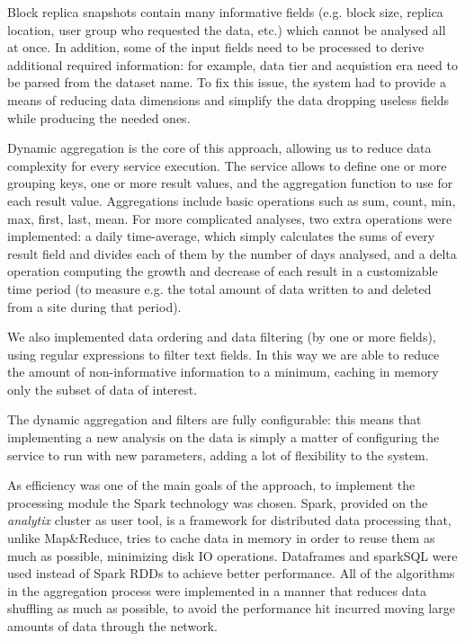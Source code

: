 \documentclass[a4paper]{jpconf}
\begin{document}
Block replica snapshots contain many informative fields (e.g. block size, replica location, user group who requested the data, etc.) which cannot be analysed all at once. In addition, some of the input fields need to be processed to derive additional required information: for example, data tier and acquistion era need to be parsed from the dataset name.
 To fix this issue, the system had to provide a means of reducing data dimensions and simplify the data dropping useless fields while producing the needed ones.
 
 
Dynamic aggregation is the core of this approach, allowing us to reduce data complexity for every service execution. The service allows to define one or more grouping keys, one or more result values, and the aggregation function to use for each result value. Aggregations include basic operations such as sum, count, min, max, first, last, mean.
For more complicated analyses, two extra operations were implemented: a daily time-average, 
which simply calculates the sums of every result field and divides each of them by the number of days analysed, and a delta operation computing the growth and decrease of each result in a customizable time period (to measure e.g. the total amount of data written to and deleted from a site during that period).

We also implemented data ordering and data filtering (by one or more fields), using regular expressions to filter text fields.
In this way we are able to reduce the amount of non-informative information to 
a minimum, caching in memory only the subset of data of interest.

The dynamic aggregation and filters are fully configurable: this means that implementing a new analysis on the data is simply a matter of configuring the service to run with new parameters, adding a lot of flexibility to the system.

As efficiency was one of the main goals of the approach, to implement the processing module the Spark \cite{Spark}  technology was chosen. Spark, provided on the \textit{analytix} cluster as user tool, is a framework for distributed data processing that, unlike Map\&Reduce, tries to cache data in memory in order to reuse them as much as possible, minimizing disk IO operations.
Dataframes \cite{Dataframes} and sparkSQL were used instead of Spark RDDs to achieve better performance. All of the algorithms in the aggregation process were implemented in a manner that reduces data shuffling as much as possible, to avoid the performance hit incurred moving large amounts of data through the network.
\end{document}

